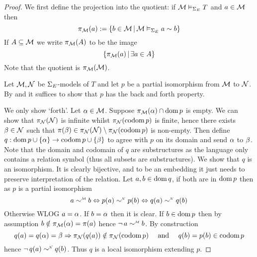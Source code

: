\begin{proof}
    We first define the projection into the quotient:
    if $\mathcal{M} \vDash_{\Sigma_E} T$ and $a \in {\mathcal{M}}$ then 
    \[\pi_{\mathcal{M}}(a) := \left\{b \in {\mathcal{M}} \,|\, \mathcal{M} \vDash_{\Sigma_E} a \sim b\right\}\]
    If $A \subseteq \mathcal{M}$ we write $\pi_{\mathcal{M}}(A)$ to be the image
    \[\left\{\pi_{\mathcal{M}}(a) \,|\, \exists a \in A\right\}\]
    Note that the quotient is $\pi_{\mathcal{M}}(\mathcal{M})$.

    Let $\mathcal{M}, \mathcal{N}$ be $\Sigma_E$-models of $T$
    and let $p$ be a partial isomorphism from $\mathcal{M}$ to $\mathcal{N}$.
    By  and 
    it suffices to show that $p$ has the back and forth property.
    
    We only show `forth'.
    Let $\alpha \in \mathcal{M}$.
    Suppose $\pi_{\mathcal{M}}(\alpha) \cap \operatorname{dom} p$ is empty.
    We can show that $\pi_{\mathcal{N}}(\mathcal{N})$ is infinite whilst 
    $\pi_{\mathcal{N}}(\operatorname{codom} p)$ is finite, 
    hence there exists $\beta \in \mathcal{N}$ such that 
    $\pi(\beta) \in \pi_{\mathcal{N}}(\mathcal{N}) \setminus \pi_{\mathcal{N}}(\operatorname{codom} p)$ is non-empty.
    Then define $q : \operatorname{dom} p \cup \left\{\alpha\right\} \to \operatorname{codom} p \cup \left\{\beta\right\}$
    to agree with $p$ on its domain and send $\alpha$ to $\beta$.
    Note that the domain and codomain of $q$ are substructures
    as the language only contains a relation symbol 
    (thus all subsets are substructures).
    We show that $q$ is an isomorphism.
    It is clearly bijective, and to be an embedding it just needs to preserve
    interpretation of the relation.
    Let $a,b \in \operatorname{dom} q$, if 
    both are in $\operatorname{dom} p$ then as $p$ is a partial isomorphism
    \[a \modintp{\MM}{\sim} b \iff p(a) \modintp{\NN}{\sim} p(b) \iff 
    q(a) \nnintp{\sim} q(b)\]
    Otherwise WLOG $a = \alpha$.
    If $b = \alpha$ then it is clear.
    If $b \in \operatorname{dom} p$ then by assumption $b \notin \pi_{\mathcal{M}}(\alpha) = \pi(a)$
    hence $\NOT a \mmintp{\sim} b$.
    By construction 
    \[q(a) = q(\alpha) = \beta \Rightarrow 
    \pi_{\mathcal{N}}(q(a)) \notin \pi_{\mathcal{N}}(\operatorname{codom} p) \quad \text{ and } \quad
    q(b) = p(b) \in \operatorname{codom} p\]
    hence $\NOT q(a) \nnintp{\sim} q(b)$.
    Thus $q$ is a local isomorphism extending $p$.


\end{proof}
